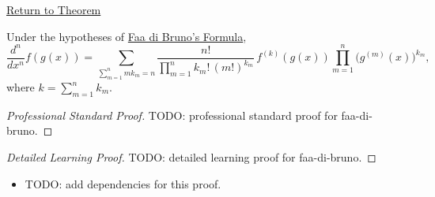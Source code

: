 \newpage
{}
\label{prf:faa-di-bruno}

\begin{remark*}[Return]
\hyperref[thm:faa-di-bruno]{Return to Theorem}
\end{remark*}

\begin{theorem*}
Under the hypotheses of \hyperref[thm:faa-di-bruno]{Faa di Bruno's Formula},
\[
  \frac{d^n}{dx^n}f(g(x))
  =
  \sum_{\sum_{m=1}^{n}mk_m=n}
  \frac{n!}{\prod_{m=1}^{n}k_m!\,(m!)^{k_m}}\,
  f^{(k)}(g(x))
  \prod_{m=1}^{n}\bigl(g^{(m)}(x)\bigr)^{k_m},
\]
where \(k=\sum_{m=1}^{n}k_m\).
\end{theorem*}

\begin{proof}[Professional Standard Proof]
\LRAProofBodyStart
TODO: professional standard proof for faa-di-bruno.
\end{proof}

\begin{proof}[Detailed Learning Proof]
\LRAProofBodyStart
TODO: detailed learning proof for faa-di-bruno.
\end{proof}

\begin{remark*}
\end{remark*}

\begin{dependencies}
\begin{itemize}
  \item TODO: add dependencies for this proof.
\end{itemize}
\end{dependencies}

\clearpage
